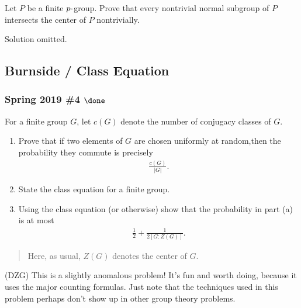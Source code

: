 Let \(P\) be a finite \(p{\hbox{-}}\)group. Prove that every nontrivial
normal subgroup of \(P\) intersects the center of \(P\) nontrivially.


Solution omitted.

\hypertarget{burnside-class-equation}{%
\subsection{Burnside / Class Equation}\label{burnside-class-equation}}

\hypertarget{spring-2019-4-done}{%
\subsubsection{\texorpdfstring{Spring 2019 \#4
\(\done\)}{Spring 2019 \#4 \textbackslash done}}\label{spring-2019-4-done}}

For a finite group \(G\), let \(c(G)\) denote the number of conjugacy
classes of \(G\).

\begin{enumerate}
\def\labelenumi{\alph{enumi}.}
\item
  Prove that if two elements of \(G\) are chosen uniformly at
  random,then the probability they commute is precisely
  \begin{align*}
  \frac{c(G)}{{\left\lvert {G} \right\rvert}}
  .\end{align*}
\item
  State the class equation for a finite group.
\item
  Using the class equation (or otherwise) show that the probability in
  part (a) is at most
  \begin{align*}
  \frac 1 2 + \frac 1 {2[G : Z(G)]}
  .\end{align*}
\end{enumerate}

\begin{quote}
Here, as usual, \(Z(G)\) denotes the center of \(G\).
\end{quote}

\begin{warnings}

(DZG) This is a slightly anomalous problem! It's fun and worth doing,
because it uses the major counting formulas. Just note that the
techniques used in this problem perhaps don't show up in other group
theory problems.

\end{warnings}

